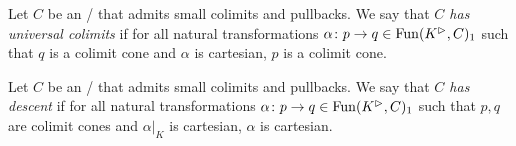 \begin{definition}[Universality]
    Let $C$ be an \inftycat/ that admits small colimits and pullbacks.
    We say that \emph{$C$ has universal colimits} if for all natural transformations $\alpha\colon p\to q\in\operatorname{Fun}(K^{\rhd},C)_1$ such that $q$ is a  colimit cone and $\alpha$ is cartesian, $p$ is a colimit cone.
\end{definition}
\begin{definition}[Descent]
    Let $C$ be an \inftycat/ that admits small colimits and pullbacks.
    We say that \emph{$C$ has descent} if for all natural transformations $\alpha\colon p\to q\in\operatorname{Fun}(K^{\rhd},C)_1$ such that $p,q$ are colimit cones and $\alpha|_K$ is cartesian, $\alpha$ is cartesian.
\end{definition}
